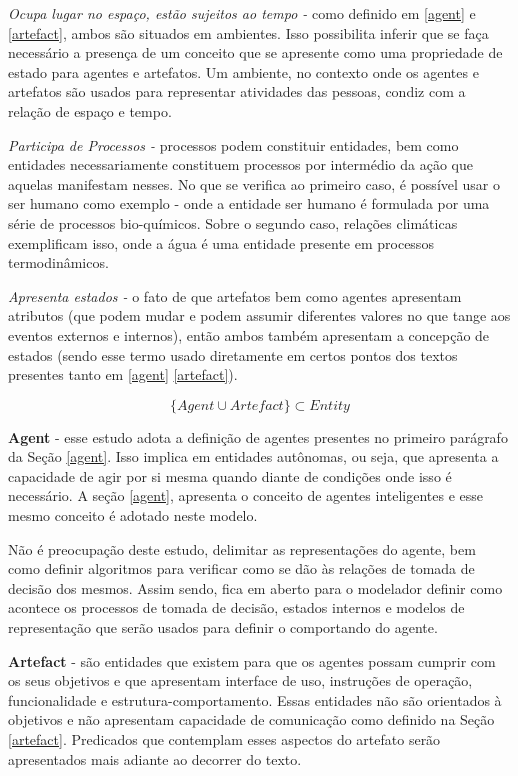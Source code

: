 \textit{Ocupa lugar no espaço, estão sujeitos ao tempo - } como definido em \ref{agent} e \ref{artefact}, ambos são situados em ambientes. 
Isso possibilita inferir que se faça necessário a presença de um conceito que se apresente como uma propriedade de estado para agentes e artefatos. Um ambiente, no contexto onde os agentes e artefatos são usados para representar atividades das pessoas, condiz com a relação de espaço e tempo. 

\textit{Participa de Processos -} processos podem constituir entidades, bem como entidades necessariamente constituem processos por intermédio da ação que aquelas manifestam nesses. No que se verifica ao primeiro caso, é possível usar o ser humano como exemplo - onde
a entidade ser humano é formulada por uma série de processos bio-químicos. Sobre o segundo caso, relações climáticas exemplificam isso, onde a água é uma entidade presente em processos termodinâmicos. 

\textit{Apresenta estados -} o fato de que artefatos bem como agentes apresentam atributos (que podem mudar e podem assumir diferentes valores no que tange aos eventos externos e internos), então ambos também apresentam a concepção de estados (sendo esse termo usado diretamente em certos pontos dos textos presentes tanto em \ref{agent} \ref{artefact}). 


\begin{equation} \label{defineentity} 
 \{ Agent \cup Artefact \} \subset Entity
\end{equation}

\textbf{Agent} - esse estudo adota a definição de agentes presentes no primeiro parágrafo da Seção \ref{agent}. Isso implica em entidades autônomas, ou seja, que apresenta a capacidade de agir por si mesma quando diante de condições onde isso é necessário. A seção \ref{agent}, apresenta o conceito de agentes inteligentes e esse mesmo conceito é adotado neste modelo. 

Não é preocupação deste estudo, delimitar as representações do agente, bem como definir algoritmos para verificar como se dão às relações de tomada de decisão dos mesmos. Assim sendo, fica em aberto para o modelador definir como acontece os processos de tomada de decisão, estados internos e modelos de representação que serão usados para definir o comportando do agente. 

\textbf{Artefact} - são entidades que existem para que os agentes possam cumprir com os seus objetivos e que apresentam interface de uso, instruções de operação, funcionalidade e estrutura-comportamento. Essas entidades não são orientados à objetivos e 
não apresentam capacidade de comunicação como definido na Seção \ref{artefact}. Predicados que contemplam esses aspectos do artefato serão apresentados mais adiante ao decorrer do texto. 

